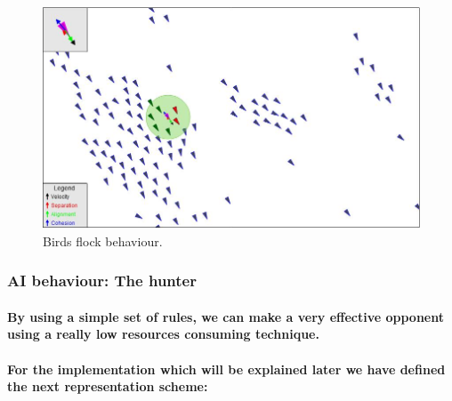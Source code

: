 \documentclass[a4paper,10pt]{article}
\newcommand{\p}[1]{\paragraph{\indent\textnormal{#1}}}
\begin{document}
	\begin{figure}[hbt]
	    \begin{center}
		\includegraphics[scale=.7]{flocking.jpg}
	    \end{center}
	    \caption{Birds flock behaviour.}
	    \label{fig:rb4}
	\end{figure}

    \subsubsection{AI behaviour: The hunter}

      \p{By using a simple set of rules, we can make a very effective opponent using a really low resources consuming technique.}

      \p{For the implementation which will be explained later we have defined the next representation scheme:}
\end{document}
